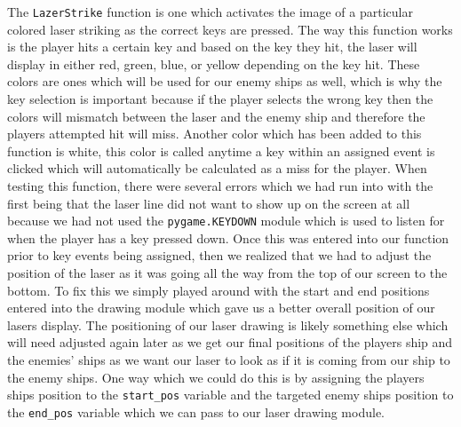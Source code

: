 The \texttt{LazerStrike} function is one which activates
the image of a particular colored laser striking as the correct keys
are pressed.  The way this function works is the player hits a
certain key and based on the key they hit, the laser will display in
either red, green, blue, or yellow depending on the key hit. These
colors are ones which will be used for our enemy ships as well,
which is why the key selection is important because if the player
selects the wrong key then the colors will mismatch between the
laser and the enemy ship and therefore the players attempted hit
will miss.  Another color which has been added to this function is
white, this color is called anytime a key within an assigned event
is clicked which will automatically be calculated as a miss for the
player.  When testing this function, there were several errors which
we had run into with the first being that the laser line did not
want to show up on the screen at all because we had not used the
\texttt{pygame.KEYDOWN} module which is used to listen
for when the player has a key pressed down. Once this was entered
into our function prior to key events being assigned, then we
realized that we had to adjust the position of the laser as it was
going all the way from the top of our screen to the bottom. To fix
this we simply played around with the start and end positions
entered into the drawing module which gave us a better overall
position of our lasers display. The positioning of our laser drawing
is likely something else which will need adjusted again later as we
get our final positions of the players ship and the enemies’ ships
as we want our laser to look as if it is coming from our ship to the
enemy ships.  One way which we could do this is by assigning the
players ships position to the \texttt{start_pos}
variable and the targeted enemy ships position to the
\texttt{end_pos} variable which we can pass to our laser
drawing module.

